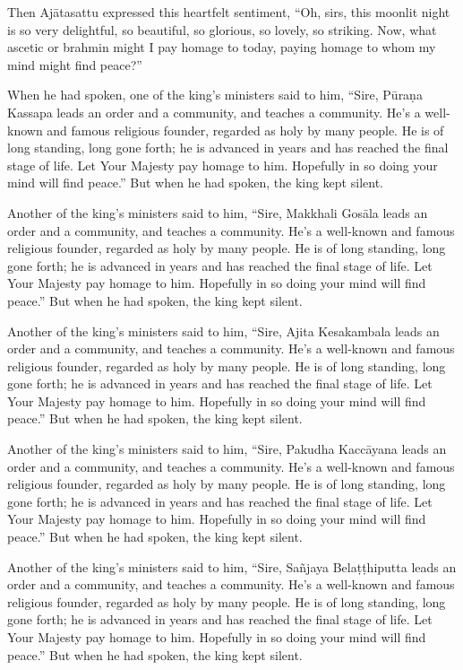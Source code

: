 \documentclass[12pt,openany]{book}%
\begin{document}
Then \textsanskrit{Ajātasattu} expressed this heartfelt sentiment, “Oh, sirs, this moonlit night is so very delightful, so beautiful, so glorious, so lovely, so striking. Now, what ascetic or brahmin might I pay homage to today, paying homage to whom my mind might find peace?” 

When he had spoken, one of the king’s ministers said to him, “Sire, \textsanskrit{Pūraṇa} Kassapa leads an order and a community, and teaches a community. He’s a well-known and famous religious founder, regarded as holy by many people. He is of long standing, long gone forth; he is advanced in years and has reached the final stage of life. Let Your Majesty pay homage to him. Hopefully in so doing your mind will find peace.” But when he had spoken, the king kept silent. 

Another of the king’s ministers said to him, “Sire, Makkhali \textsanskrit{Gosāla} leads an order and a community, and teaches a community. He’s a well-known and famous religious founder, regarded as holy by many people. He is of long standing, long gone forth; he is advanced in years and has reached the final stage of life. Let Your Majesty pay homage to him. Hopefully in so doing your mind will find peace.” But when he had spoken, the king kept silent. 

Another of the king’s ministers said to him, “Sire, Ajita Kesakambala leads an order and a community, and teaches a community. He’s a well-known and famous religious founder, regarded as holy by many people. He is of long standing, long gone forth; he is advanced in years and has reached the final stage of life. Let Your Majesty pay homage to him. Hopefully in so doing your mind will find peace.” But when he had spoken, the king kept silent. 

Another of the king’s ministers said to him, “Sire, Pakudha \textsanskrit{Kaccāyana} leads an order and a community, and teaches a community. He’s a well-known and famous religious founder, regarded as holy by many people. He is of long standing, long gone forth; he is advanced in years and has reached the final stage of life. Let Your Majesty pay homage to him. Hopefully in so doing your mind will find peace.” But when he had spoken, the king kept silent. 

Another of the king’s ministers said to him, “Sire, \textsanskrit{Sañjaya} \textsanskrit{Belaṭṭhiputta} leads an order and a community, and teaches a community. He’s a well-known and famous religious founder, regarded as holy by many people. He is of long standing, long gone forth; he is advanced in years and has reached the final stage of life. Let Your Majesty pay homage to him. Hopefully in so doing your mind will find peace.” But when he had spoken, the king kept silent. 
\end{document}
